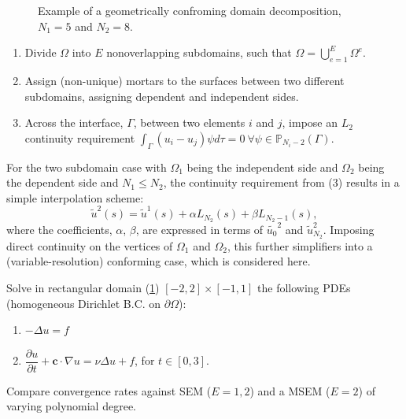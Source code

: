 \documentclass[final,t]{beamer}
\begin{document}
\begin{frame}[fragile]{}
\begin{columns}[t]
\begin{column}{.45\linewidth}
\begin{tcolorbox}[toplevelbox,adjusted title=Approach]
\begin{figure}
\caption{\label{fig:domaindecomp} Example of a geometrically confroming domain decomposition, $N_1 = 5$ and $N_2 = 8$.}
      \end{figure}
\begin{enumerate}
\def\labelenumi{\arabic{enumi}.}
\item
  Divide \(\Omega\) into \(E\) nonoverlapping subdomains, such that
  \(\Omega=\bigcup_{e=1}^{E} \Omega ^e\).
\item
  Assign (non-unique) mortars to the surfaces between two different subdomains, assigning dependent and independent sides.
\item
  Across the interface, \(\Gamma\), between two elements \(i\) and
  \(j\), impose an \(L_2\) continuity requirement
  \(\int_{\Gamma}(u_i-u_j)\psi d\tau = 0\ \forall \psi \in \mathbb{P}_{N_i-2}(\Gamma)\).
\end{enumerate}

For the two subdomain case with \(\Omega_1\) being the independent side and \(\Omega_2\)
being the dependent side and $N_1 \le N_2$, the continuity requirement from (3) results
in a simple interpolation scheme:
\begin{equation}
\tilde{u}^2(s) = \tilde{u}^1(s) + \alpha L_{N_2}(s) + \beta L_{N_2-1}(s) \nonumber ,
\end{equation}
where the coefficients, $\alpha$, $\beta$, are expressed in terms of $\tilde{u_0}^2$ and
$\tilde{u}_{N_2}^2$. Imposing direct continuity on the vertices of $\Omega_1$ and $\Omega_2$,
this further simplifiers into a (variable-resolution) conforming case, which is considered here.

      \end{tcolorbox}

      \begin{tcolorbox}[toplevelbox,adjusted title= Test Cases]
      Solve in rectangular domain (\ref{fig:domaindecomp}) $[-2,2]\times[-1,1]$
      the following PDEs (homogeneous Dirichlet B.C. on $\partial\Omega$):
\begin{enumerate}
\item
$-\Delta u = f$
\item
$\dfrac{\partial u}{\partial t} + \boldsymbol{c} \cdot \nabla u = \nu \Delta u +f$, for $t\in[0,3]$.
\end{enumerate}
      Compare convergence rates against SEM ($E=1,2$)
      and a MSEM ($E=2$) of varying polynomial degree.
      \end{tcolorbox}
    \end{column}


\end{columns}
\end{frame}
\end{document}
